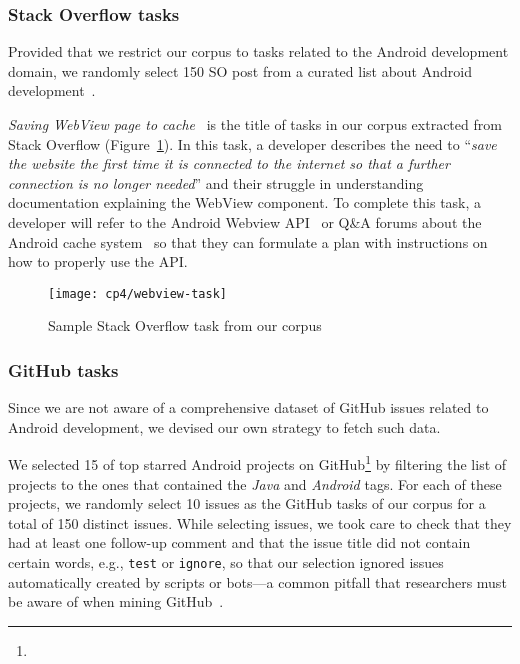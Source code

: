 \subsubsection{Stack Overflow tasks}

Provided that we restrict our corpus to tasks related to the Android development domain,
we randomly select 150 SO post from a curated list about Android development~\cite{baltes2019-rep}.


\textit{Saving WebView page to cache}~\cite{so18607655}
is the title of tasks in our corpus extracted from Stack Overflow (Figure~\ref{fig:webview-task}). In this task, a developer describes the need
to
``\textit{save the website the first time it is connected to the internet so that a further connection is no longer needed}''
and their struggle in understanding documentation explaining the WebView component.
To complete this task, a developer will refer to the Android Webview API~\cite{apiWebView}
or Q\&A forums about the Android cache system~\cite{so8410830} so that they can 
formulate a plan with instructions on how to properly use the API.

\begin{figure}
    \centering
    \texttt{[image: cp4/webview-task]}
    \caption{Sample Stack Overflow task from our corpus}
    \label{fig:webview-task}
\end{figure}


\subsubsection{GitHub tasks}

Since we are not aware of a comprehensive dataset of GitHub issues related to Android development, we devised our own strategy to fetch such data.


We selected 15 of top starred Android projects on GitHub\footnote{} by filtering the list of projects to the ones that contained the \textit{Java} and \textit{Android} tags.
For each of these projects, we randomly select 10 issues as the GitHub tasks of our corpus for a total of 150 distinct issues.
While selecting issues, we took care to check that they had at least one follow-up comment and that the issue title did not contain certain words, e.g., {\small \texttt{test}} or {\small  \texttt{ignore}},
so that our selection ignored issues automatically created by scripts or bots---a common pitfall that researchers must be aware of when mining GitHub~\cite{kalliamvakou2014}.




